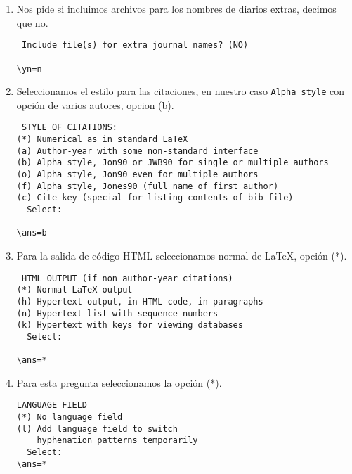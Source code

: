 \begin{enumerate}
\begin{verbatim}
 (./merlin.mbs
<<< For more information about the meanings of
<<< the various options, see the section on 
<<< Menu Information in the .mbs file documentation.

EXTERNAL FILES:

Name of language definition file (default=merlin.mbs)

\cfile=spanish.mbs
\end{verbatim}

\item Nos pide si incluimos archivos para los nombres de diarios extras, decimos que no.

\begin{verbatim}
 Include file(s) for extra journal names? (NO)

\yn=n
\end{verbatim}

\item Seleccionamos el estilo para las citaciones, en nuestro caso \verb|Alpha style| con opción de varios autores,  opcion (b).

\begin{verbatim}
 STYLE OF CITATIONS:
(*) Numerical as in standard LaTeX
(a) Author-year with some non-standard interface
(b) Alpha style, Jon90 or JWB90 for single or multiple authors
(o) Alpha style, Jon90 even for multiple authors
(f) Alpha style, Jones90 (full name of first author)
(c) Cite key (special for listing contents of bib file)
  Select:

\ans=b
\end{verbatim}

\item Para la salida de código HTML seleccionamos  normal de \LaTeX{}, opción (*).

\begin{verbatim}
 HTML OUTPUT (if non author-year citations)
(*) Normal LaTeX output
(h) Hypertext output, in HTML code, in paragraphs
(n) Hypertext list with sequence numbers
(k) Hypertext with keys for viewing databases
  Select:

\ans=*
\end{verbatim}

\item Para esta pregunta seleccionamos la opción (*).

\begin{verbatim}
LANGUAGE FIELD
(*) No language field 
(l) Add language field to switch 
    hyphenation patterns temporarily
  Select:
\ans=* 
\end{verbatim}


\end{enumerate}
